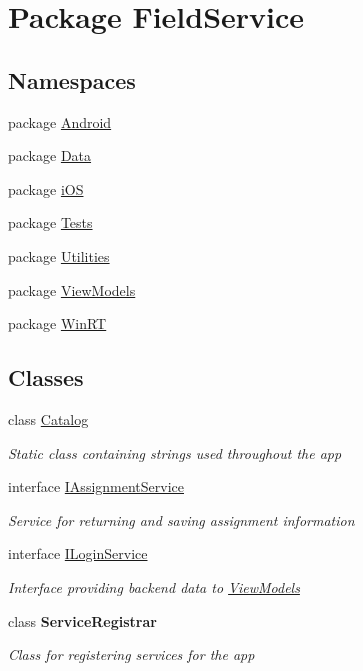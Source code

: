 \hypertarget{namespace_field_service}{\section{Package Field\+Service}
\label{namespace_field_service}
}
\subsection*{Namespaces}
\begin{DoxyCompactItemize}
\item 
package \hyperlink{namespace_field_service_1_1_android}{Android}
\item 
package \hyperlink{namespace_field_service_1_1_data}{Data}
\item 
package \hyperlink{namespace_field_service_1_1i_o_s}{i\+O\+S}
\item 
package \hyperlink{namespace_field_service_1_1_tests}{Tests}
\item 
package \hyperlink{namespace_field_service_1_1_utilities}{Utilities}
\item 
package \hyperlink{namespace_field_service_1_1_view_models}{View\+Models}
\item 
package \hyperlink{namespace_field_service_1_1_win_r_t}{Win\+R\+T}
\end{DoxyCompactItemize}
\subsection*{Classes}
\begin{DoxyCompactItemize}
\item 
class \hyperlink{class_field_service_1_1_catalog}{Catalog}
\begin{DoxyCompactList}\small\item\em Static class containing strings used throughout the app \end{DoxyCompactList}\item 
interface \hyperlink{interface_field_service_1_1_i_assignment_service}{I\+Assignment\+Service}
\begin{DoxyCompactList}\small\item\em Service for returning and saving assignment information \end{DoxyCompactList}\item 
interface \hyperlink{interface_field_service_1_1_i_login_service}{I\+Login\+Service}
\begin{DoxyCompactList}\small\item\em Interface providing backend data to \hyperlink{namespace_field_service_1_1_view_models}{View\+Models} \end{DoxyCompactList}\item 
class {\bfseries Service\+Registrar}
\begin{DoxyCompactList}\small\item\em Class for registering services for the app \end{DoxyCompactList}\end{DoxyCompactItemize}
